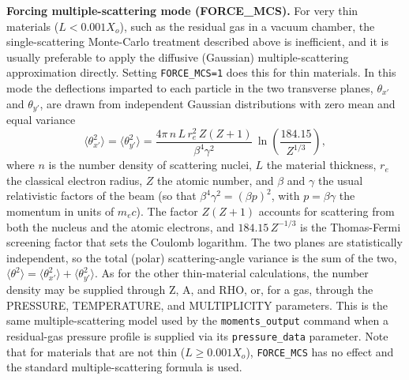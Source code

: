 {\bf Forcing multiple-scattering mode (FORCE\_MCS).}  For very thin
materials ($L<0.001 X_o$), such as the residual gas in a vacuum
chamber, the single-scattering Monte-Carlo treatment described above is
inefficient, and it is usually preferable to apply the diffusive
(Gaussian) multiple-scattering approximation directly.  Setting
\verb|FORCE_MCS=1| does this for thin materials.  In this mode the
deflections imparted to each particle in the two transverse planes,
$\theta_{x'}$ and $\theta_{y'}$, are drawn from independent Gaussian
distributions with zero mean and equal variance
\begin{equation}
\langle\theta_{x'}^2\rangle = \langle\theta_{y'}^2\rangle =
  \frac{4\pi\, n\, L\, r_e^2\, Z(Z+1)}{\beta^4\gamma^2}\,
  \ln\!\left(\frac{184.15}{Z^{1/3}}\right),
\end{equation}
where $n$ is the number density of scattering nuclei, $L$ the material
thickness, $r_e$ the classical electron radius, $Z$ the atomic number,
and $\beta$ and $\gamma$ the usual relativistic factors of the beam
(so that $\beta^4\gamma^2=(\beta p)^2$, with $p=\beta\gamma$ the
momentum in units of $m_e c$).  The factor $Z(Z+1)$ accounts for
scattering from both the nucleus and the atomic electrons, and
$184.15\,Z^{-1/3}$ is the Thomas-Fermi screening factor that sets the
Coulomb logarithm.  The two planes are statistically independent, so
the total (polar) scattering-angle variance is the sum of the two,
$\langle\theta^2\rangle = \langle\theta_{x'}^2\rangle +
\langle\theta_{y'}^2\rangle$.  As for the other thin-material
calculations, the number density may be supplied through Z, A, and RHO,
or, for a gas, through the PRESSURE, TEMPERATURE, and MULTIPLICITY
parameters.  This is the same multiple-scattering model used by the
\verb|moments_output| command when a residual-gas pressure profile is
supplied via its \verb|pressure_data| parameter.  Note that for
materials that are not thin ($L\geq0.001 X_o$), \verb|FORCE_MCS| has no
effect and the standard multiple-scattering formula is used.

